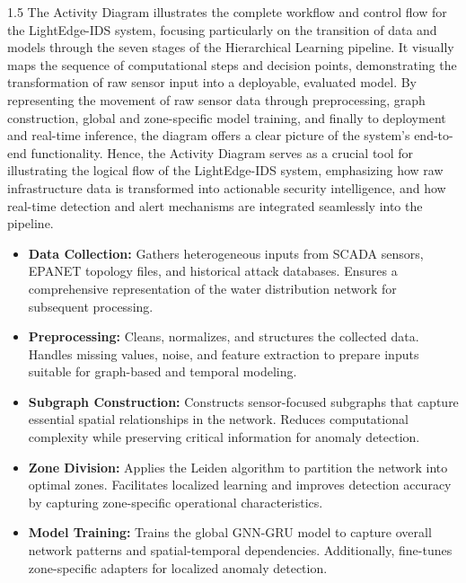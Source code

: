 \begin{spacing}{1.5}
The Activity Diagram illustrates the complete workflow and control flow for the LightEdge-IDS system, focusing particularly on the transition of data and models through the seven stages of the Hierarchical Learning pipeline. It visually maps the sequence of computational steps and decision points, demonstrating the transformation of raw sensor input into a deployable, evaluated model. By representing the movement of raw sensor data through preprocessing, graph construction, global and zone-specific model training, and finally to deployment and real-time inference, the diagram offers a clear picture of the system’s end-to-end functionality. Hence, the Activity Diagram serves as a crucial tool for illustrating the logical flow of the LightEdge-IDS system, emphasizing how raw infrastructure data is transformed into actionable security intelligence, and how real-time detection and alert mechanisms are integrated seamlessly into the pipeline.

\begin{itemize}

    \item \textbf{Data Collection:}  
    Gathers heterogeneous inputs from SCADA sensors, EPANET topology files, and historical attack databases. Ensures a comprehensive representation of the water distribution network for subsequent processing.

    \item \textbf{Preprocessing:}  
    Cleans, normalizes, and structures the collected data. Handles missing values, noise, and feature extraction to prepare inputs suitable for graph-based and temporal modeling.

    \item \textbf{Subgraph Construction:}  
    Constructs sensor-focused subgraphs that capture essential spatial relationships in the network. Reduces computational complexity while preserving critical information for anomaly detection.

    \item \textbf{Zone Division:}  
    Applies the Leiden algorithm to partition the network into optimal zones. Facilitates localized learning and improves detection accuracy by capturing zone-specific operational characteristics.

    \item \textbf{Model Training:}  
    Trains the global GNN-GRU model to capture overall network patterns and spatial-temporal dependencies. Additionally, fine-tunes zone-specific adapters for localized anomaly detection.


\end{itemize}
\end{spacing}

